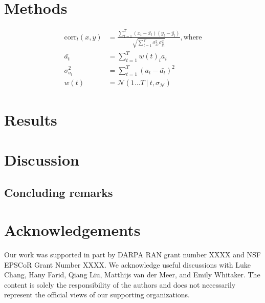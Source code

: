 \documentclass[english]{article}
\begin{document}
\section*{Methods}

\begin{align}
\mathrm{corr}_t(x,y) &= \frac{\sum_{t=1}^T \left( x_t - \bar{x_t} \right) \left( y_t - \bar{y_t} \right)}{\sqrt{\sum_{t=1}^{T}\sigma ^{2}_{x_{t}}\sigma ^{2}_{y_{t}}}}\mathrm{, where}\\
\bar{a_t} &= \sum_{t=1}^T w(t)_i a_i\\
\sigma^{2}_{a_t} &= \sum_{t=1}^{T} \left(a_t - \bar{a_t} \right)^2\\
w(t) &= \mathcal{N}\left(1...T ~|~ t, \sigma_\mathcal{N}\right) %
\end{align}






\section*{Results}

\section*{Discussion}

\subsection*{Concluding remarks}

\section*{Acknowledgements}
Our work was supported in part by DARPA RAN grant number XXXX and NSF EPSCoR Grant Number XXXX.  We acknowledge useful discussions with Luke Chang, Hany Farid, Qiang Liu, Matthijs van der Meer, and Emily Whitaker.  The content is solely the responsibility of the authors and does not necessarily represent the official views of our supporting organizations.



\end{document}
